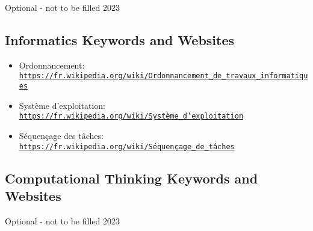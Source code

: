 \documentclass[a4paper,11pt]{report}
\newcommand{\BrochureUrlText}[1]{\texttt{#1}}
\begin{document}
Optional - not to be filled 2023


\subsection*{Informatics Keywords and Websites}

\begin{itemize}
  \item Ordonnancement: \href{https://fr.wikipedia.org/wiki/Ordonnancement_de_travaux_informatiques}{\BrochureUrlText{https://fr.wikipedia.org/wiki/Ordonnancement\_de\_travaux\_informatiques}}
  \item Système d’exploitation: \href{https://fr.wikipedia.org/wiki/Syst\%C3\%A8me_d\%27exploitation}{\BrochureUrlText{https://fr.wikipedia.org/wiki/Système\_d’exploitation}}
  \item Séquençage des tâches: \href{https://fr.wikipedia.org/wiki/S\%C3\%A9quen\%C3\%A7age_de_t\%C3\%A2ches}{\BrochureUrlText{https://fr.wikipedia.org/wiki/Séquençage\_de\_tâches}}
\end{itemize}


\subsection*{Computational Thinking Keywords and Websites}

Optional - not to be filled 2023
\end{document}
